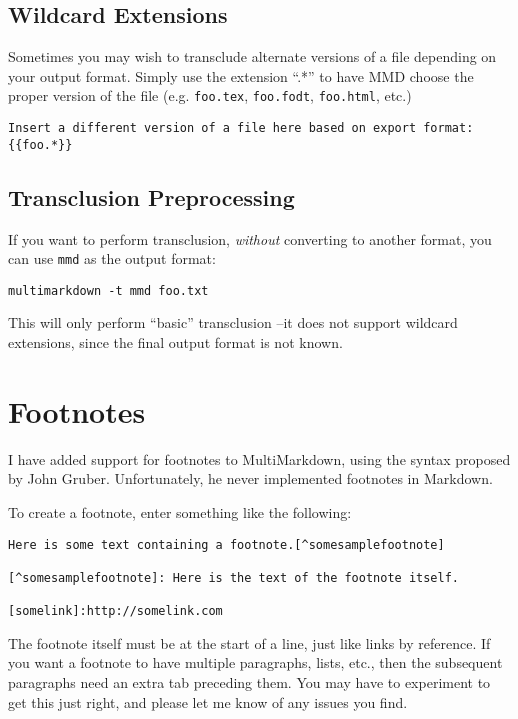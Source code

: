 \subsection{Wildcard Extensions}
\label{wildcardextensions}

Sometimes you may wish to transclude alternate versions of a file depending on your output format. Simply use the extension ``.*'' to have \gls{MMD} choose the proper version of the file (e.g. \texttt{foo.tex}, \texttt{foo.fodt}, \texttt{foo.html}, etc.)

\begin{verbatim}
Insert a different version of a file here based on export format:
{{foo.*}}
\end{verbatim}

\subsection{Transclusion Preprocessing}
\label{transclusionpreprocessing}

If you want to perform transclusion, \emph{without} converting to another format, you can use \texttt{mmd} as the output format:

\begin{verbatim}
multimarkdown -t mmd foo.txt
\end{verbatim}

This will only perform ``basic'' transclusion --it does not support wildcard extensions, since the final output format is not known.

\section{Footnotes}
\label{footnotes}

I have added support for footnotes to MultiMarkdown, using the syntax proposed by John Gruber. Unfortunately, he never implemented footnotes in Markdown.

To create a footnote, enter something like the following:

\begin{verbatim}
Here is some text containing a footnote.[^somesamplefootnote]

[^somesamplefootnote]: Here is the text of the footnote itself.

[somelink]:http://somelink.com
\end{verbatim}

The footnote itself must be at the start of a line, just like links by reference. If you want a footnote to have multiple paragraphs, lists, etc., then the subsequent paragraphs need an extra tab preceding them. You may have to experiment to get this just right, and please let me know of any issues you find.


